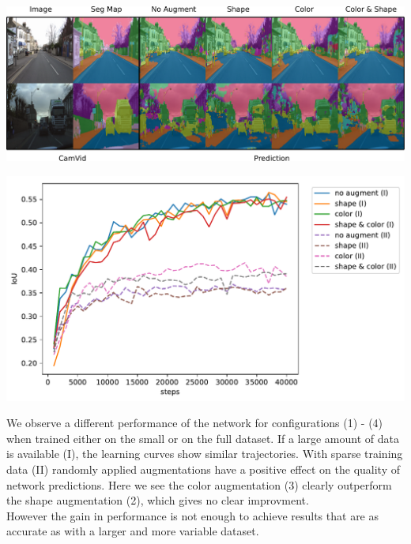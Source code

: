 \documentclass[a0paper,portrait]{baposter}
\begin{document}
\begin{poster}
{\begin{minipage}[t]{0.49\textwidth}\centering
    \vspace{3pt}
    \includegraphics[width=\linewidth]{prediction.pdf}
\end{minipage}\hfill
\begin{minipage}[t]{0.49\textwidth}\centering
    \vspace{0pt}
    \includegraphics[width=\linewidth]{result.pdf}
\end{minipage}
\vspace{.5\baselineskip}

We observe a different performance of the network for configurations (1) - (4) when trained either on the small or on the full dataset. If a large amount of data is available (I), the learning curves show similar trajectories. With sparse training data (II) randomly applied augmentations have a positive effect on the quality of network predictions. Here we see the color augmentation (3) clearly outperform the shape augmentation (2), which gives no clear improvment.\\
However the gain in performance is not enough to achieve results that are as accurate as with a larger and more variable dataset.
\vspace{10px}
}



\end{poster}
\end{document}
